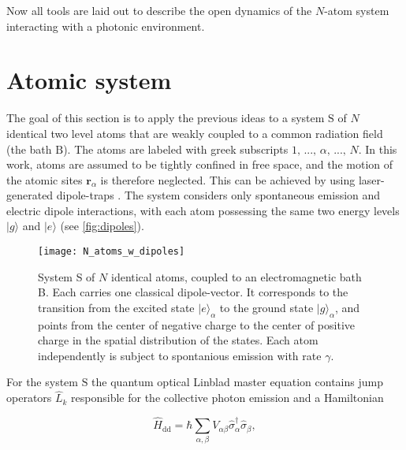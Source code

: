 \noindent
Now all tools are laid out to describe the open dynamics of the $N$-atom system interacting with a photonic environment.



\section{Atomic system}\label{sec:Adapt_to_System}
The goal of this section is to apply the previous ideas to a system $ \text{S} $ of $ N $ identical two level atoms
that are weakly coupled to a common radiation field (the bath $\text{B}$).
The atoms are labeled with greek subscripts $ 1 \text{, ..., } \alpha \text{, ..., } N $.
In this work, atoms are assumed to be tightly confined in free space,
and the motion of the atomic sites $ \mathbf{r}_\alpha $ is therefore neglected.
This can be achieved by using laser-generated dipole-traps \cite{GRIMM200095}.
The system considers only spontaneous emission and electric dipole interactions, with each atom possessing the same two energy levels $ \vert g \rangle $ and $ \vert e \rangle $ (see \autoref{fig:dipoles}).

\begin{figure}[ht]
    \centering
    \texttt{[image: N\_atoms\_w\_dipoles]}
    \caption{System S of $ N $ identical atoms, coupled to an electromagnetic bath B.
    Each carries one classical dipole-vector.
    It corresponds to the transition from the excited state $ \vert e \rangle_\alpha $ to the ground state $ \vert g \rangle_\alpha $,
    and points from the center of negative charge to the center of positive charge in the spatial distribution of the states.
    Each atom independently is subject to spontanious emission with rate $ \gamma $.}
    \label{fig:dipoles}
\end{figure}

\noindent
For the system $ \text{S} $ the quantum optical Linblad master equation
contains jump operators $\hat{L}_k$
responsible for the collective photon emission and a Hamiltonian

\begin{equation} \label{eq:Dipole_Dipole_interaction}
\hat{H}_{\text{dd}} = \hbar \sum_{\alpha, \beta} V_{\alpha\beta} \hat{\sigma}_{\alpha}^{\dagger} \hat{\sigma}_{\beta},
\end{equation}

